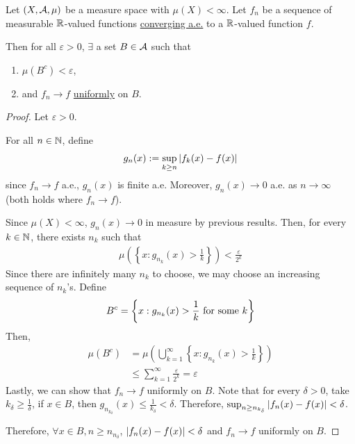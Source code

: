 \documentclass[11pt]{article}
\begin{document}
	\begin{theorem}
		Let $(X, \mathcal{{A}}, \mu)$ be a measure space with $\mu(X) < \infty$. Let $f_n$ be a sequence of measurable $\mathbb{R}$-valued functions \ul{converging a.e.} to a $\mathbb{R}$-valued function $f$.
		
		Then for all $\varepsilon > 0$, $\exists$ a set $B \in \mathcal{{A}}$ such that
		\begin{enumerate}
			\item $\mu(B^c) < \varepsilon$,
			\item and $f_n \to f$ \ul{uniformly} on $B$.
		\end{enumerate}
		\begin{proof}
			Let $\varepsilon > 0$.
			
			For all $n \in \mathbb{N}$, define
			\begin{align}
				g_n(x) := \sup_{k \geq n} \left \vert {f_k(x) - f(x)} \right \vert
			\end{align}
			since $f_n \to f$ a.e., $g_n(x)$ is finite a.e. Moreover, $g_n(x) \to 0$ a.e. as $n \to \infty$ (both holds where $f_n \to f$).
			
			Since $\mu(X) < \infty$, $g_n(x) \to 0$ in measure by previous results. Then, for every $k \in \mathbb{N}$, there exists $n_k$ such that
			\begin{align}
				\mu\left(\left\{x : g_{n_k}(x) > \frac{1}{k} \right\}\right) < \frac{\varepsilon}{2^k}
			\end{align}
			Since there are infinitely many $n_k$ to choose, we may choose an increasing sequence of $n_k$'s. Define
			\begin{align}
				B^c = \left\{ x: g_{n_k}(x) > \frac{1}{k} \text{{ for some }} k\right\}
			\end{align}
			Then,
			\begin{align}
				\mu(B^c) &= \mu\left(\bigcup_{k=1}^\infty \left\{ x: g_{n_k}(x) > \frac{1}{k} \right\}\right) \\
				&\leq \sum_{k=1}^\infty \frac{\varepsilon}{2^k} = \varepsilon
			\end{align}
			Lastly, we can show that $f_n \to f$ uniformly on $B$. Note that for every $\delta > 0$, take $k_\delta \geq \frac{1}{\delta}$, if $x \in B$, then $g_{n_{k_\delta}}(x) \leq \frac{1}{k_\delta} < \delta$. Therefore, $\sup_{n \geq n_{k_\delta}} \left \vert {f_n(x) - f(x)} \right \vert < \delta$.
			
			Therefore, $\forall x\in B, n \geq n_{n_\delta}$, $\left \vert {f_n(x) - f(x)} \right \vert < \delta$ and $f_n \to f$ uniformly on $B$.
		\end{proof}
	\end{theorem}
	
\end{document}
